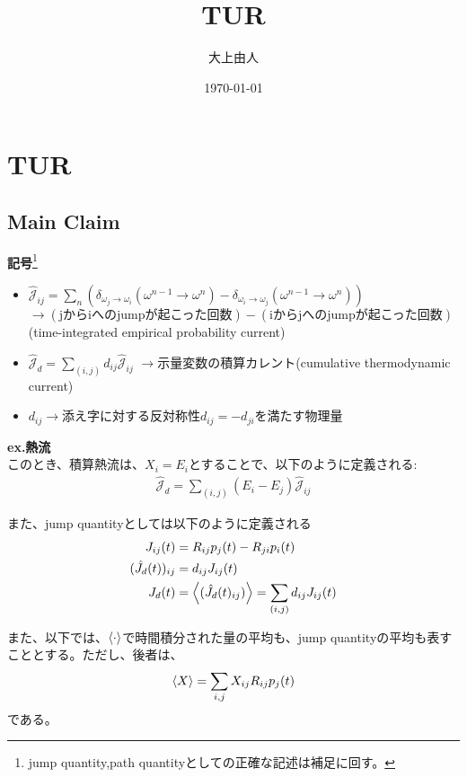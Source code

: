\documentclass[a4paper,11pt]{jsarticle}
\numberwithin{equation}{section}
\begin{document}
\title{TUR}
\author{大上由人}
\date{\today}
\maketitle

\section{TUR}
\subsection{Main Claim}
\textbf{記号}\footnote{jump quantity,path quantityとしての正確な記述は補足に回す。}
\begin{itemize}
    \item $\hat{\mathcal{J}}_{ij} = \sum_{n} (\delta_{\omega_j \to \omega_i}(\omega^{n-1}\to \omega^n) - \delta_{\omega_i \to \omega_j}(\omega^{n-1}\to \omega^n))$\\
$\to (\text{jからiへのjumpが起こった回数})-(\text{iからjへのjumpが起こった回数})$(time-integrated empirical probability current)\\
    \item $\hat{\mathcal{J}}_{d} = \sum_{(i,j)} d_{ij} \hat{\mathcal{J}}_{ij}$
$\to$示量変数の積算カレント(cumulative thermodynamic current)
    \item $d_{ij}\to$添え字に対する反対称性$d_{ij} = -d_{ji}$を満たす物理量
\end{itemize}

\textbf{ex.熱流}\\
このとき、積算熱流は、$X_i = E_i$とすることで、以下のように定義される:
\begin{align}
    \hat{\mathcal{J}}_{d} = \sum_{(i,j)} (E_i - E_j) \hat{\mathcal{J}}_{ij}
\end{align}

また、jump quantityとしては以下のように定義される\\
\begin{align}
    {J}_{ij}(t) &= R_{ij}p_j(t) - R_{ji}p_i(t)\\
    (\hat{J}_{d}(t))_{ij} &= d_{ij} {J}_{ij}(t)\\
    J_{d}(t) &= \ev{(\hat{J}_{d}(t)_{ij})} = \sum_{(i,j)} d_{ij} {J}_{ij}(t)
\end{align}

また、以下では、$\ev{\cdot}$で時間積分された量の平均も、jump quantityの平均も表すこととする。ただし、後者は、
\begin{align}
    \ev{X} = \sum_{i,j} X_{ij} R_{ij}p_j(t)
\end{align}
である。\\
\end{document}
